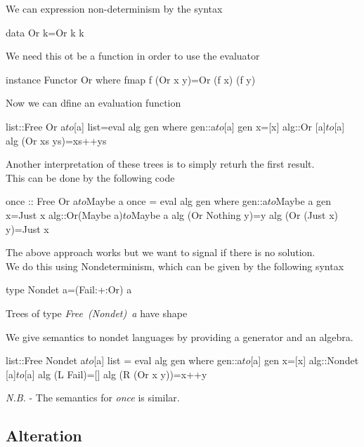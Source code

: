 \documentclass[11pt,a4paper]{article}
\begin{document}
We can expression non-determinism by the syntax
\begin{code}
data Or k=Or k k
\end{code}
We need this ot be a function in order to use the evaluator
\begin{code}
instance Functor Or
  where
    fmap f (Or x y)=Or (f x) (f y)
\end{code}
Now we can dfine an evaluation function
\begin{code}
list::Free Or a$to$[a]
list=eval alg gen
  where
    gen::a$to$[a]
    gen x=[x]
    alg::Or [a]$to$[a]
    alg (Or xs ys)=xs++ys
\end{code}
Another interpretation of these trees is to simply returh the first result.\\
This can be done by the following code
\begin{code}
once :: Free Or a$to$Maybe a
once = eval alg gen
  where
    gen::a$to$Maybe a
    gen x=Just x
    alg::Or(Maybe a)$to$Maybe a
    alg (Or Nothing  y)=y
    alg (Or (Just x) y)=Just x
\end{code}

The above approach works but we want to signal if there is no solution.\\
We do this using Nondeterminism, which can be given by the following syntax
\begin{code}
type Nondet a=(Fail:+:Or) a
\end{code}

Trees of type \textit{Free\ (Nondet)\ a} have shape\\

We give semantics to nondet languages by providing a generator and an algebra.\\
\begin{code}
list::Free Nondet a$to$[a]
list = eval alg gen
  where
    gen::a$to$[a]
    gen x=[x]
    alg::Nondet [a]$to$[a]
    alg (L Fail)=[]
    alg (R (Or x y))=x++y
\end{code}
\textit{N.B.} - The semantics for \textit{once} is similar.\\

\subsection{Alteration}
\end{document}
